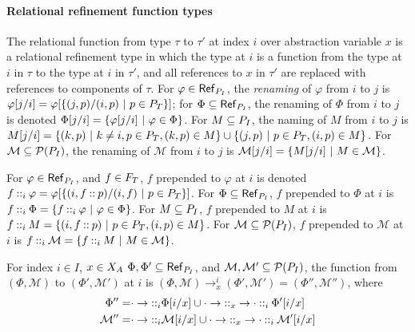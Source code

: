 \paragraph{Relational refinement function types}
%
The relational function from type $\tau$ to $\tau'$ at index $i$ over
abstraction variable $x$ is a relational refinement type in which the
type at $i$ is a function from the type at $i$ in $\tau$ to the type
at $i$ in $\tau'$, and all references to $x$ in $\tau'$ are replaced
with references to components of $\tau$.
For $\varphi \in \refpreds{ \idxpos{I} }$, the \emph{renaming} of
$\varphi$ from $i$ to $j$ is
$\rename{\varphi}{i}{j} = \varphi[ \setformer{(j, p) / (i, p)}{ p \in
  \typos} ]$;
for $\Phi \subseteq \refpreds{\idxpos{I}}$, the renaming of $\Phi$
from $i$ to $j$ is denoted
$\rename{\Phi}{i}{j} = \setformer{ \rename{\varphi}{i}{j} }{ \varphi
  \in \Phi }$.
For $M \subseteq \idxpos{I}$, the naming of $M$ from $i$ to $j$ is
$\rename{M}{i}{j} = %
\setformer{ (k, p) }{ k \not= i, p \in \typos, (k, p) \in M } \union %
\setformer{ (j, p) }{ p \in \typos, (i, p) \in M }$.
For $\mathcal{M} \subseteq \pset(\idxpos{I})$, the renaming of
$\mathcal{M}$ from $i$ to $j$ is
$\rename{\mathcal{M}}{i}{j} = \setformer{ \rename{M}{i}{j} }{ M \in
  \mathcal{M} }$.
  
For $\varphi \in \refpreds{ \idxpos{I} }$, and $f \in \typosfields$,
$f$ prepended to $\varphi$ at $i$ is denoted
$f \prepend{i} \varphi = \varphi[ \setformer{ (i, f \cons p) / (i,
  f)}{ p \in \typos } ]$.
%  
For $\Phi \subseteq \refpreds{ \idxpos{I} }$, $f$ prepended to $\Phi$
at $i$ is
$f \prepend{i} \Phi = \setformer{ f \prepend{i} \varphi }{ \varphi \in
  \Phi }$.
For $M \subseteq \idxpos{I}$, $f$ prepended to $M$ at $i$ is
$f \prepend{i} M = \setformer{ (i, f \cons p) }{ p \in \typos,
  (i, p) \in M}$.
%
For $\mathcal{M} \subseteq \pset(\idxpos{I})$, $f$ prepended to
$\mathcal{M}$ at $i$ is
$f \prepend{i} \mathcal{M} = \setformer{ f \prepend{i} M }{ M
  \in \mathcal{M} }$.

For index $i \in I$, $x \in \absvars$ %
$\Phi, \Phi' \subseteq \refpreds{ \idxpos{I} }$, and %
$\mathcal{M}, \mathcal{M}' \subseteq \pset(\idxpos{I})$, the function
from $(\Phi, \mathcal{M})$ to $(\Phi', \mathcal{M}')$ at $i$ is
$(\Phi, \mathcal{M}) \to_x^i (\Phi', \mathcal{M}') = (\Phi'',
\mathcal{M}'')$, where
\begin{align*}
  \Phi'' = & \typaramfield \prepend{i} \rename{\Phi}{x}{i} \union %
  \rename{ \typaramfield \prepend{x} \tyresfield \prepend{i} \Phi' }{ x }{ i
  } \\
  \mathcal{M}'' = & \typaramfield \prepend{i} \rename{ \mathcal{M} }{ x }{ i } \union %
                    \rename{ \typaramfield \prepend{x} \tyresfield \prepend{i}
                    \mathcal{M}' }{ x }{ i }
\end{align*}

